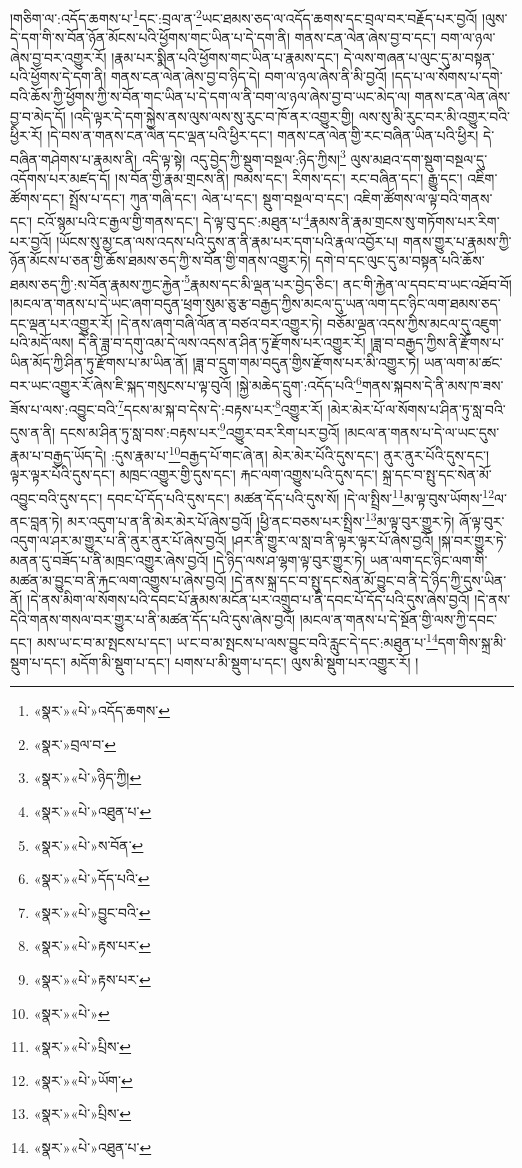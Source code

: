 །གཅིག་ལ་:འདོད་ཆགས་པ་\footnote{«སྣར་»«པེ་»འདོད་ཆགས་}དང་:བྲལ་ན་\footnote{«སྣར་»བྲལ་བ་}ཡང་ཐམས་ཅད་ལ་འདོད་ཆགས་དང་བྲལ་བར་བརྗོད་པར་བྱའོ། །ལུས་དེ་དག་གི་ས་བོན་ཉོན་མོངས་པའི་ཕྱོགས་གང་ཡིན་པ་དེ་དག་ནི། གནས་ངན་ལེན་ཞེས་བྱ་བ་དང་། བག་ལ་ཉལ་ཞེས་བྱ་བར་འགྱུར་རོ། །རྣམ་པར་སྨིན་པའི་ཕྱོགས་གང་ཡིན་པ་རྣམས་དང་། དེ་ལས་གཞན་པ་ལུང་དུ་མ་བསྟན་པའི་ཕྱོགས་དེ་དག་ནི། གནས་ངན་ལེན་ཞེས་བྱ་བ་ཉིད་དེ། བག་ལ་ཉལ་ཞེས་ནི་མི་བྱའོ། །དད་པ་ལ་སོགས་པ་དགེ་བའི་ཆོས་ཀྱི་ཕྱོགས་ཀྱི་ས་བོན་གང་ཡིན་པ་དེ་དག་ལ་ནི་བག་ལ་ཉལ་ཞེས་བྱ་བ་ཡང་མེད་ལ། གནས་ངན་ལེན་ཞེས་བྱ་བ་མེད་དོ། །འདི་ལྟར་དེ་དག་སྐྱེས་ནས་ལུས་ལས་སུ་རུང་བ་ཁོ་ནར་འགྱུར་གྱི། ལས་སུ་མི་རུང་བར་མི་འགྱུར་བའི་ཕྱིར་རོ། །དེ་བས་ན་གནས་ངན་ལེན་དང་ལྡན་པའི་ཕྱིར་དང་། གནས་ངན་ལེན་གྱི་རང་བཞིན་ཡིན་པའི་ཕྱིར། དེ་བཞིན་གཤེགས་པ་རྣམས་ནི། འདི་ལྟ་སྟེ། འདུ་བྱེད་ཀྱི་སྡུག་བསྔལ་:ཉིད་ཀྱིས།\footnote{«སྣར་»«པེ་»ཉིད་ཀྱི།} ལུས་མཐའ་དག་སྡུག་བསྔལ་དུ་འདོགས་པར་མཛད་དོ། །ས་བོན་གྱི་རྣམ་གྲངས་ནི། ཁམས་དང་། རིགས་དང་། རང་བཞིན་དང་། རྒྱུ་དང་། འཇིག་ཚོགས་དང་། སྤྲོས་པ་དང་། ཀུན་གཞི་དང་། ལེན་པ་དང་། སྡུག་བསྔལ་བ་དང་། འཇིག་ཚོགས་ལ་ལྟ་བའི་གནས་དང་། ངའོ་སྙམ་པའི་ང་རྒྱལ་གྱི་གནས་དང་། དེ་ལྟ་བུ་དང་:མཐུན་པ་\footnote{«སྣར་»«པེ་»འཐུན་པ་}རྣམས་ནི་རྣམ་གྲངས་སུ་གཏོགས་པར་རིག་པར་བྱའོ། །ཡོངས་སུ་མྱ་ངན་ལས་འདས་པའི་དུས་ན་ནི་རྣམ་པར་དག་པའི་རྣལ་འབྱོར་པ། གནས་གྱུར་པ་རྣམས་ཀྱི་ཉོན་མོངས་པ་ཅན་གྱི་ཆོས་ཐམས་ཅད་ཀྱི་ས་བོན་གྱི་གནས་འགྱུར་ཏེ། དགེ་བ་དང་ལུང་དུ་མ་བསྟན་པའི་ཆོས་ཐམས་ཅད་ཀྱི་:ས་བོན་རྣམས་ཀྱང་རྐྱེན་\footnote{«སྣར་»«པེ་»ས་བོན་}རྣམས་དང་མི་ལྡན་པར་བྱེད་ཅིང་། ནང་གི་རྐྱེན་ལ་དབང་བ་ཡང་འཐོབ་བོ། །མངལ་ན་གནས་པ་དེ་ཡང་ཞག་བདུན་ཕྲག་སུམ་ཅུ་རྩ་བརྒྱད་ཀྱིས་མངལ་དུ་ཡན་ལག་དང་ཉིང་ལག་ཐམས་ཅད་དང་ལྡན་པར་འགྱུར་རོ། །དེ་ནས་ཞག་བཞི་ལོན་ན་བཙའ་བར་འགྱུར་ཏེ། བཅོམ་ལྡན་འདས་ཀྱིས་མངལ་དུ་འཇུག་པའི་མདོ་ལས། དེ་ནི་ཟླ་བ་དགུ་འམ་དེ་ལས་འདས་ན་ཤིན་ཏུ་རྫོགས་པར་འགྱུར་རོ། །ཟླ་བ་བརྒྱད་ཀྱིས་ནི་རྫོགས་པ་ཡིན་མོད་ཀྱི་ཤིན་ཏུ་རྫོགས་པ་མ་ཡིན་ནོ། །ཟླ་བ་དྲུག་གམ་བདུན་གྱིས་རྫོགས་པར་མི་འགྱུར་ཏེ། ཡན་ལག་མ་ཚང་བར་ཡང་འགྱུར་རོ་ཞེས་ཇི་སྐད་གསུངས་པ་ལྟ་བུའོ། །སྐྱེ་མཆེད་དྲུག་:འདོད་པའི་\footnote{«སྣར་»«པེ་»དོད་པའི་}གནས་སྐབས་དེ་ནི་མས་ཁ་ཟས་ཟོས་པ་ལས་:འབྱུང་བའི་\footnote{«སྣར་»«པེ་»བྱུང་བའི་}དངས་མ་སྐ་བ་དེས་དེ་:བརྟས་པར་\footnote{«སྣར་»«པེ་»རྟས་པར་}འགྱུར་རོ། །མེར་མེར་པོ་ལ་སོགས་པ་ཤིན་ཏུ་སླ་བའི་དུས་ན་ནི། དངས་མ་ཤིན་ཏུ་སླ་བས་:བརྟས་པར་\footnote{«སྣར་»«པེ་»རྟས་པར་}འགྱུར་བར་རིག་པར་བྱའོ། །མངལ་ན་གནས་པ་དེ་ལ་ཡང་དུས་རྣམ་པ་བརྒྱད་ཡོད་དེ། :དུས་རྣམ་པ་\footnote{«སྣར་»«པེ་»}བརྒྱད་པོ་གང་ཞེ་ན། མེར་མེར་པོའི་དུས་དང་། ནུར་ནུར་པོའི་དུས་དང་། ལྟར་ལྟར་པོའི་དུས་དང་། མཁྲང་འགྱུར་གྱི་དུས་དང་། རྐང་ལག་འགྱུས་པའི་དུས་དང་། སྐྲ་དང་བ་སྤུ་དང་སེན་མོ་འབྱུང་བའི་དུས་དང་། དབང་པོ་དོད་པའི་དུས་དང་། མཚན་དོད་པའི་དུས་སོ། །དེ་ལ་སྤྲིས་\footnote{«སྣར་»«པེ་»པྲིས་}མ་ལྟ་བུས་ཡོགས་\footnote{«སྣར་»«པེ་»ཡོག་}ལ་ནང་བླན་ཏེ། མར་འདུག་པ་ན་ནི་མེར་མེར་པོ་ཞེས་བྱའོ། །ཕྱི་ནང་བཅས་པར་སྤྲིས་\footnote{«སྣར་»«པེ་»པྲིས་}མ་ལྟ་བུར་གྱུར་ཏེ། ཞོ་ལྟ་བུར་འདུག་ལ་ཤར་མ་གྱུར་པ་ནི་ནུར་ནུར་པོ་ཞེས་བྱའོ། །ཤར་ནི་གྱུར་ལ་སླ་བ་ནི་ལྟར་ལྟར་པོ་ཞེས་བྱའོ། །སྐ་བར་གྱུར་ཏེ་མནན་དུ་བཟོད་པ་ནི་མཁྲང་འགྱུར་ཞེས་བྱའོ། །དེ་ཉིད་ལས་ཤ་ལྷག་ལྟ་བུར་གྱུར་ཏེ། ཡན་ལག་དང་ཉིང་ལག་གི་མཚན་མ་བྱུང་བ་ནི་རྐང་ལག་འགྱུས་པ་ཞེས་བྱའོ། །དེ་ནས་སྐྲ་དང་བ་སྤུ་དང་སེན་མོ་བྱུང་བ་ནི་དེ་ཉིད་ཀྱི་དུས་ཡིན་ནོ། །དེ་ནས་མིག་ལ་སོགས་པའི་དབང་པོ་རྣམས་མངོན་པར་འགྲུབ་པ་ནི་དབང་པོ་དོད་པའི་དུས་ཞེས་བྱའོ། །དེ་ནས་དེའི་གནས་གསལ་བར་གྱུར་པ་ནི་མཚན་དོད་པའི་དུས་ཞེས་བྱའོ། །མངལ་ན་གནས་པ་དེ་སྔོན་གྱི་ལས་ཀྱི་དབང་དང་། མས་ཡ་ང་བ་མ་སྤངས་པ་དང་། ཡ་ང་བ་མ་སྤངས་པ་ལས་བྱུང་བའི་རླུང་དེ་དང་:མཐུན་པ་\footnote{«སྣར་»«པེ་»འཐུན་པ་}དག་གིས་སྐྲ་མི་སྡུག་པ་དང་། མདོག་མི་སྡུག་པ་དང་། པགས་པ་མི་སྡུག་པ་དང་། ལུས་མི་སྡུག་པར་འགྱུར་རོ། །
